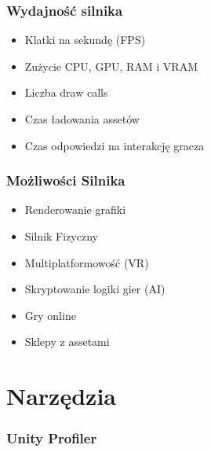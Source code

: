 \documentclass{beamer}
\begin{document}
\begin{frame} 
  \frametitle{Wydajność silnika}
  \begin{itemize}
    \item Klatki na sekundę (FPS)
    \item Zużycie CPU, GPU, RAM i VRAM
    \item Liczba draw calls 
    \item Czas ładowania assetów 
    \item Czas odpowiedzi na interakcję gracza
  \end{itemize} 
\end{frame}
\begin{frame}
    \frametitle{Możliwości Silnika}
    \begin{itemize}
        \item Renderowanie grafiki 
        \item Silnik Fizyczny 
        \item Multiplatformowość (VR)
        \item Skryptowanie logiki gier (AI)
        \item Gry online
        \item Sklepy z assetami
    \end{itemize}
  \end{frame}
    \section{Narzędzia}
      \frametitle{Unity Profiler}
      {
        \begin{frame}
        \end{frame}
        }
\end{document}
